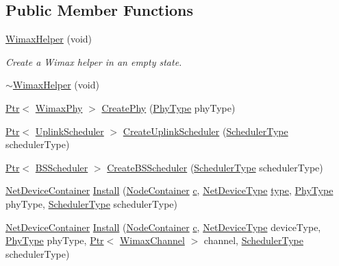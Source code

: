 \subsection*{Public Member Functions}
\begin{DoxyCompactItemize}
\item 
\hyperlink{classns3_1_1WimaxHelper_afc97310d5f8ec313b7849245c0af016f}{Wimax\+Helper} (void)
\begin{DoxyCompactList}\small\item\em Create a Wimax helper in an empty state. \end{DoxyCompactList}\item 
\hyperlink{classns3_1_1WimaxHelper_a6e93bfffed9d962dd158cc9241e79c21}{$\sim$\+Wimax\+Helper} (void)
\item 
\hyperlink{classns3_1_1Ptr}{Ptr}$<$ \hyperlink{classns3_1_1WimaxPhy}{Wimax\+Phy} $>$ \hyperlink{classns3_1_1WimaxHelper_a5b287ad1386475dde1e946910a203899}{Create\+Phy} (\hyperlink{classns3_1_1WimaxHelper_a42439a8e9f959fd3f5bdf698d248f71a}{Phy\+Type} phy\+Type)
\item 
\hyperlink{classns3_1_1Ptr}{Ptr}$<$ \hyperlink{classns3_1_1UplinkScheduler}{Uplink\+Scheduler} $>$ \hyperlink{classns3_1_1WimaxHelper_a3b237b459ffd98a13d71612d985f9e90}{Create\+Uplink\+Scheduler} (\hyperlink{classns3_1_1WimaxHelper_a27a40a8f601900126156781c2ca79406}{Scheduler\+Type} scheduler\+Type)
\item 
\hyperlink{classns3_1_1Ptr}{Ptr}$<$ \hyperlink{classns3_1_1BSScheduler}{B\+S\+Scheduler} $>$ \hyperlink{classns3_1_1WimaxHelper_a583fc7ce6463c687092e9ef8d03413af}{Create\+B\+S\+Scheduler} (\hyperlink{classns3_1_1WimaxHelper_a27a40a8f601900126156781c2ca79406}{Scheduler\+Type} scheduler\+Type)
\item 
\hyperlink{classns3_1_1NetDeviceContainer}{Net\+Device\+Container} \hyperlink{classns3_1_1WimaxHelper_a9f0848e09c4b6db9cdde9872b38f6349}{Install} (\hyperlink{classns3_1_1NodeContainer}{Node\+Container} \hyperlink{mmwave_2model_2fading-traces_2fading__trace__generator_8m_ae0323a9039add2978bf5b49550572c7c}{c}, \hyperlink{classns3_1_1WimaxHelper_a2c8fd9211cf4d7605e506b7c983d78fc}{Net\+Device\+Type} \hyperlink{visualizer-ideas_8txt_add98db9e15e2a58cf2b57623e7aa893a}{type}, \hyperlink{classns3_1_1WimaxHelper_a42439a8e9f959fd3f5bdf698d248f71a}{Phy\+Type} phy\+Type, \hyperlink{classns3_1_1WimaxHelper_a27a40a8f601900126156781c2ca79406}{Scheduler\+Type} scheduler\+Type)
\item 
\hyperlink{classns3_1_1NetDeviceContainer}{Net\+Device\+Container} \hyperlink{classns3_1_1WimaxHelper_afa527d7cf5d240ee6ba0986c331475cb}{Install} (\hyperlink{classns3_1_1NodeContainer}{Node\+Container} \hyperlink{mmwave_2model_2fading-traces_2fading__trace__generator_8m_ae0323a9039add2978bf5b49550572c7c}{c}, \hyperlink{classns3_1_1WimaxHelper_a2c8fd9211cf4d7605e506b7c983d78fc}{Net\+Device\+Type} device\+Type, \hyperlink{classns3_1_1WimaxHelper_a42439a8e9f959fd3f5bdf698d248f71a}{Phy\+Type} phy\+Type, \hyperlink{classns3_1_1Ptr}{Ptr}$<$ \hyperlink{classns3_1_1WimaxChannel}{Wimax\+Channel} $>$ channel, \hyperlink{classns3_1_1WimaxHelper_a27a40a8f601900126156781c2ca79406}{Scheduler\+Type} scheduler\+Type)

\end{DoxyCompactItemize}
